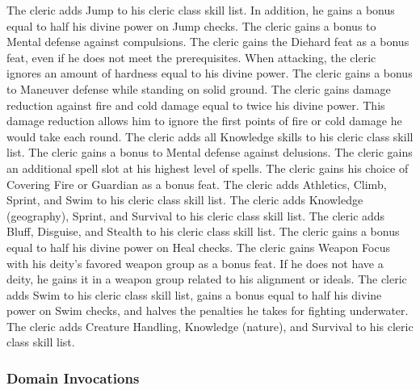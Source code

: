 The cleric adds Jump to his cleric class skill list.
In addition, he gains a bonus equal to half his divine power on Jump checks.
The cleric gains a  bonus to Mental defense against compulsions.
The cleric gains the Diehard feat as a bonus feat, even if he does not meet the prerequisites.
When attacking, the cleric ignores an amount of hardness equal to his divine power.
The cleric gains a  bonus to Maneuver defense while standing on solid ground.
\x
{}
The cleric gains damage reduction against fire and cold damage equal to twice his divine power.
This damage reduction allows him to ignore the first points of fire or cold damage he would take each round.
\x
{}
The cleric adds all Knowledge skills to his cleric class skill list.
The cleric gains a  bonus to Mental defense against delusions.
The cleric gains an additional spell slot at his highest level of spells.
The cleric gains his choice of Covering Fire or Guardian as a bonus feat.
The cleric adds Athletics, Climb, Sprint, and Swim to his cleric class skill list.
The cleric adds Knowledge (geography), Sprint, and Survival to his cleric class skill list.
The cleric adds Bluff, Disguise, and Stealth to his cleric class skill list.
The cleric gains a bonus equal to half his divine power on Heal checks.
The cleric gains Weapon Focus with his deity's favored weapon group as a bonus feat.
If he does not have a deity, he gains it in a weapon group related to his alignment or ideals.
The cleric adds Swim to his cleric class skill list, gains a bonus equal to half his divine power on Swim checks, and halves the penalties he takes for fighting underwater.
The cleric adds Creature Handling, Knowledge (nature), and Survival to his cleric class skill list.

\subsubsection{Domain Invocations}\label{Domain Invocations}

